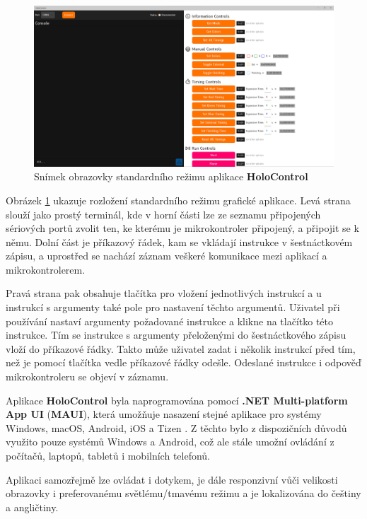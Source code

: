 \documentclass[twoside,project]{../MFFPrace}
\begin{document}
\begin{figure}[!ht]
    \centering
    \includegraphics[width=\linewidth]{../img/HoloControl-UI.png}
    \caption{Snímek obrazovky standardního režimu aplikace \textbf{HoloControl}}
    \label{img:holocontrol}
\end{figure}

Obrázek \ref{img:holocontrol} ukazuje rozložení standardního režimu grafické aplikace. Levá strana slouží jako prostý terminál, kde v horní části lze ze seznamu připojených sériových portů zvolit ten, ke kterému je mikrokontroler připojený, a připojit se k němu. Dolní část je příkazový řádek, kam se vkládají instrukce v šestnáctkovém zápisu, a uprostřed se nachází záznam veškeré komunikace mezi aplikací a mikrokontrolerem.

Pravá strana pak obsahuje tlačítka pro vložení jednotlivých instrukcí a u instrukcí s argumenty také pole pro nastavení těchto argumentů. Uživatel při používání nastaví argumenty požadované instrukce a klikne na tlačítko této instrukce. Tím se instrukce s argumenty přeloženými do šestnáctkového zápisu vloží do příkazové řádky. Takto může uživatel zadat i několik instrukcí před tím, než je pomocí tlačítka vedle příkazové řádky odešle. Odeslané instrukce i odpověď mikrokontroleru se objeví v záznamu.

\medskip

Aplikace \textbf{HoloControl} byla naprogramována pomocí \textbf{.NET Multi-platform App UI} (\textbf{MAUI}), která umožňuje nasazení stejné aplikace pro systémy Windows, macOS, Android, iOS a Tizen \cite{maui}. Z těchto bylo z dispozičních důvodů využito pouze systémů Windows a Android, což ale stále umožní ovládání z počítačů, laptopů, tabletů i mobilních telefonů.

Aplikaci samozřejmě lze ovládat i dotykem, je dále responzivní vůči velikosti obrazovky i preferovanému světlému/tmavému režimu a je lokalizována do češtiny a angličtiny.
\end{document}
